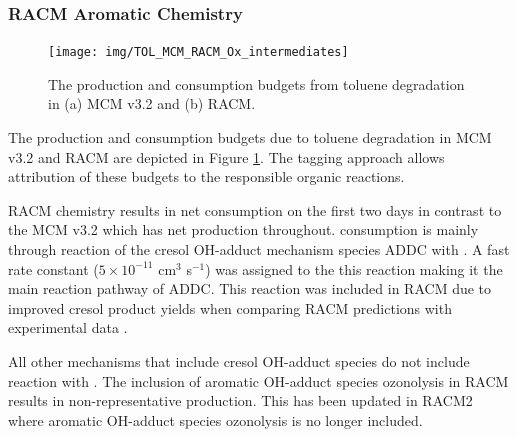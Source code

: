 \subsubsection{RACM Aromatic Chemistry} \label{sss:RACM_aromatic}

\begin{figure}
    \begin{center}
        \texttt{[image: img/TOL\_MCM\_RACM\_Ox\_intermediates]}
    \end{center}
    \caption{The  production and consumption budgets from toluene degradation in (a) MCM v3.2 and (b) RACM.}
    \label{f:TOL_MCM_RACM}
\end{figure}

The  production and consumption budgets due to toluene degradation in MCM v3.2 and RACM are depicted in Figure \ref{f:TOL_MCM_RACM}. 
The tagging approach allows attribution of these budgets to the responsible organic reactions.

RACM chemistry results in net  consumption on the first two days in contrast to the MCM v3.2 which has net  production throughout. 
 consumption is mainly through reaction of the cresol OH-adduct mechanism species ADDC with . 
A fast rate constant ($5 \times 10^{-11}$ cm$^3$ s$^{-1}$) was assigned to the this reaction making it the main reaction pathway of ADDC. 
This reaction was included in RACM due to improved cresol product yields when comparing RACM predictions with experimental data \citep{Stockwell:1997}.

All other mechanisms that include cresol OH-adduct species do not include reaction with . 
The inclusion of aromatic OH-adduct species ozonolysis in RACM results in non-representative  production. 
This has been updated in RACM2 where aromatic OH-adduct species ozonolysis is no longer included.

